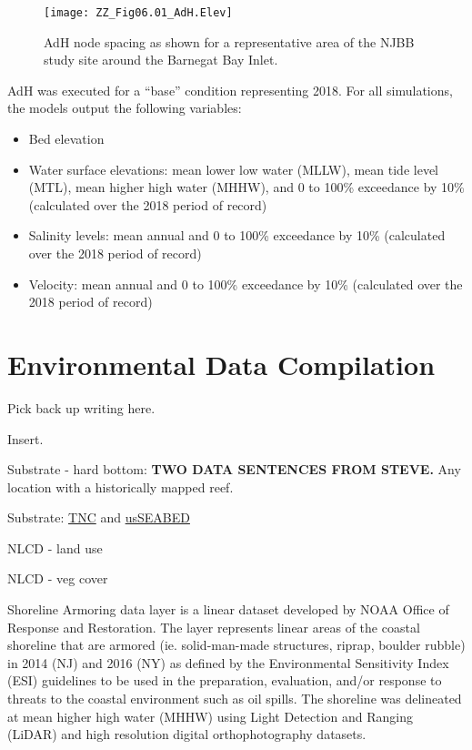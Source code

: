 \documentclass[
]{book}
\providecommand{\tightlist}{%
  \setlength{\itemsep}{0pt}\setlength{\parskip}{0pt}}
\begin{document}
\begin{figure}
\texttt{[image: ZZ\_Fig06.01\_AdH.Elev]} \caption{AdH node spacing as shown for a representative area of the NJBB study site around the Barnegat Bay Inlet.}\label{fig:unnamed-chunk-30}
\end{figure}

AdH was executed for a ``base'' condition representing 2018. For all simulations, the models output the following variables:

\begin{itemize}
\tightlist
\item
  Bed elevation\\
\item
  Water surface elevations: mean lower low water (MLLW), mean tide level (MTL), mean higher high water (MHHW), and 0 to 100\% exceedance by 10\% (calculated over the 2018 period of record)\\
\item
  Salinity levels: mean annual and 0 to 100\% exceedance by 10\% (calculated over the 2018 period of record)\\
\item
  Velocity: mean annual and 0 to 100\% exceedance by 10\% (calculated over the 2018 period of record)
\end{itemize}

\hypertarget{environmental-data-compilation}{%
\section{Environmental Data Compilation}\label{environmental-data-compilation}}

{Pick back up writing here.}

Insert.

Substrate - hard bottom: \textbf{TWO DATA SENTENCES FROM STEVE.} Any location with a historically mapped reef.

Substrate: \href{https://maps.coastalresilience.org/newjersey/\#}{TNC} and \href{https://www.usgs.gov/programs/cmhrp/science/usseabed}{usSEABED}

NLCD - land use

NLCD - veg cover

Shoreline Armoring data layer is a linear dataset developed by NOAA Office of Response and Restoration. The layer represents linear areas of the coastal shoreline that are armored (ie. solid-man-made structures, riprap, boulder rubble) in 2014 (NJ) and 2016 (NY) as defined by the Environmental Sensitivity Index (ESI) guidelines to be used in the preparation, evaluation, and/or response to threats to the coastal environment such as oil spills. The shoreline was delineated at mean higher high water (MHHW) using Light Detection and Ranging (LiDAR) and high resolution digital orthophotography datasets.
\end{document}
